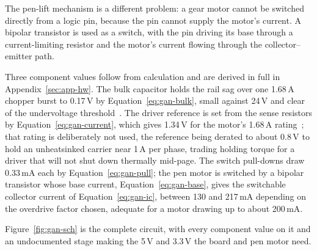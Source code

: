 The pen-lift mechanism is a different problem: a gear motor cannot be switched directly from a logic pin, because the pin cannot supply the motor's current. A bipolar transistor is used as a switch, with the pin driving its base through a current-limiting resistor and the motor's current flowing through the collector--emitter path.

Three component values follow from calculation and are derived in full in Appendix~\ref{sec:app-hw}. The bulk capacitor holds the rail sag over one 1.68\,A chopper burst to 0.17\,V by Equation~\ref{eq:gan-bulk}, small against 24\,V and clear of the undervoltage threshold~\cite{a4988ds}. The driver reference is set from the sense resistors by Equation~\ref{eq:gan-current}, which gives 1.34\,V for the motor's 1.68\,A rating~\cite{stepperds}; that rating is deliberately not used, the reference being derated to about 0.8\,V to hold an unheatsinked carrier near 1\,A per phase, trading holding torque for a driver that will not shut down thermally mid-page. The switch pull-downs draw 0.33\,mA each by Equation~\ref{eq:gan-pull}; the pen motor is switched by a bipolar transistor whose base current, Equation~\ref{eq:gan-base}, gives the switchable collector current of Equation~\ref{eq:gan-ic}, between 130 and 217\,mA depending on the overdrive factor chosen, adequate for a motor drawing up to about 200\,mA.

Figure~\ref{fig:gan-sch} is the complete circuit, with every component value on it and an undocumented stage making the 5\,V and 3.3\,V the board and pen motor need.

